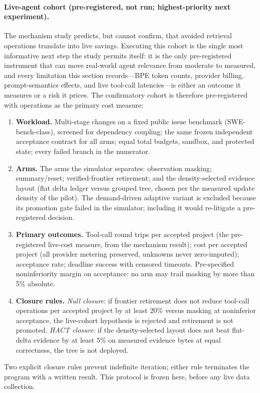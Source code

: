 \paragraph{Live-agent cohort (pre-registered, not run; highest-priority next experiment).}\label{sec:live-protocol}
The mechanism study predicts, but cannot confirm, that avoided
retrieval operations translate into live savings. Executing this
cohort is the single most informative next step the study permits
itself: it is the only pre-registered instrument that can move
real-world agent relevance from moderate to measured, and every
limitation this section records---BPE token counts, provider billing,
prompt-semantics effects, and live tool-call latencies---is either an
outcome it measures or a risk it prices. The confirmatory
cohort is therefore pre-registered with operations as the primary cost
measure:
\begin{enumerate}[leftmargin=*,itemsep=1pt]
\item \textbf{Workload.} Multi-stage changes on a fixed public issue
benchmark (SWE-bench-class), screened for dependency coupling; the
same frozen independent acceptance contract for all arms; equal total
budgets, sandbox, and protected state; every failed branch in the
numerator.
\item \textbf{Arms.} The arms the simulator separates:
observation masking; summary/reset; verified-frontier retirement; and
the density-selected evidence layout (flat delta ledger versus
grouped tree, chosen per the measured update density of the pilot).
The demand-driven adaptive variant is excluded because its promotion
gate failed in the simulator; including it would re-litigate a
pre-registered decision.
\item \textbf{Primary outcomes.} Tool-call round trips per accepted
project (the pre-registered live-cost measure, from the mechanism
result); cost per accepted project (all provider metering preserved,
unknowns never zero-imputed); acceptance rate; deadline success with
censored timeouts. Pre-specified noninferiority margin on acceptance:
no arm may trail masking by more than 5\% absolute.
\item \textbf{Closure rules.} \emph{Null closure}: if frontier
retirement does not reduce tool-call operations per accepted project
by at least 20\% versus masking at noninferior acceptance, the
live-cohort hypothesis is rejected and retirement is not promoted.
\emph{HACT closure}: if the density-selected layout does not beat
flat-delta evidence by at least 5\% on measured evidence bytes at
equal correctness, the tree is not deployed.
\end{enumerate}
Two explicit closure rules prevent indefinite iteration; either rule
terminates the program with a written result. This protocol is frozen
here, before any live data collection.

